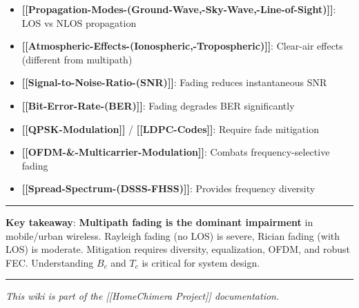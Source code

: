 \begin{itemize}
\tightlist
\item
  \textbf{{[}{[}Propagation-Modes-(Ground-Wave,-Sky-Wave,-Line-of-Sight){]}{]}}:
  LOS vs NLOS propagation
\item
  \textbf{{[}{[}Atmospheric-Effects-(Ionospheric,-Tropospheric){]}{]}}:
  Clear-air effects (different from multipath)
\item
  \textbf{{[}{[}Signal-to-Noise-Ratio-(SNR){]}{]}}: Fading reduces
  instantaneous SNR
\item
  \textbf{{[}{[}Bit-Error-Rate-(BER){]}{]}}: Fading degrades BER
  significantly
\item
  \textbf{{[}{[}QPSK-Modulation{]}{]}} /
  \textbf{{[}{[}LDPC-Codes{]}{]}}: Require fade mitigation
\item
  \textbf{{[}{[}OFDM-\&-Multicarrier-Modulation{]}{]}}: Combats
  frequency-selective fading
\item
  \textbf{{[}{[}Spread-Spectrum-(DSSS-FHSS){]}{]}}: Provides frequency
  diversity
\end{itemize}

\begin{center}\rule{0.5\linewidth}{0.5pt}\end{center}

\textbf{Key takeaway}: \textbf{Multipath fading is the dominant
impairment} in mobile/urban wireless. Rayleigh fading (no LOS) is
severe, Rician fading (with LOS) is moderate. Mitigation requires
diversity, equalization, OFDM, and robust FEC. Understanding \(B_c\) and
\(T_c\) is critical for system design.

\begin{center}\rule{0.5\linewidth}{0.5pt}\end{center}

\emph{This wiki is part of the {[}{[}Home\textbar Chimera Project{]}{]}
documentation.}
